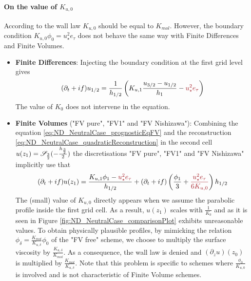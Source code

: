 \paragraph{On the value of $K_{u,0}$}
\label{sec:ND_StratifiedCase_viscosity0_FVpure}
According to the wall law $K_{u,0}$ should be equal to $K_{mol}$.
However, the boundary condition $K_{u,0} \phi_0 = u_\star^2 e_\tau$
does not behave the same way with Finite Differences and Finite
Volumes.
\begin{itemize}
	\item \textbf{Finite Differences}:
Injecting the boundary condition at the first grid level gives
		\begin{equation}
			(\partial_t+if) u_{1/2} = \frac{1}{h_{1/2}}
			\left(K_{u,1}\frac{u_{3/2} - u_{1/2}}{h_1}
			 - \emphase{u_\star^2 e_\tau} \right)
		\end{equation}
The value of $K_0$ does not intervene in the equation.
\item \textbf{Finite Volumes} ("FV pure", "FV1" and "FV Nishizawa"):
Combining the equation \eqref{eq:ND_NeutralCase_prognosticEqFV}
and the reconstruction
\eqref{eq:ND_NeutralCase_quadraticReconstruction} in the second cell
$u(z_1) = {\cal S}_{\frac{3}{2}}(-\frac{h_\frac{3}{2}}{2})$
the discretisations "FV pure", "FV1" and "FV Nishizawa"
implicitly use that
\begin{equation}
	(\partial_t+if) u(z_1) =
	\frac{K_{u,1} \phi_1 - \emphase{u_\star^2 e_\tau}}{h_{1/2}}
	+ (\partial_t+if)\left(\frac{\phi_1}{3}
	+ \emphase{\frac{u_\star^2 e_\tau}{6 K_{u,0}}}\right)h_{1/2}
\end{equation}
The (small) value of $K_{u,0}$ directly appears when we assume the
parabolic profile inside the first grid cell.
As a result, $u(z_1)$ scales with $\frac{1}{K_0}$ and
as it is seen in Figure \ref{fig:ND_NeutralCase_comparisonPlot}
exhibits unreasonable values.
To obtain physically plausible profiles,
by mimicking the relation
$\phi_{\delta} = \frac{K_{mol}}{K_{u,\delta}}\phi_0$ of the
"FV free" scheme, we choose to multiply the surface
viscosity by $\frac{K_{u,\delta}}{K_{mol}}$.
As a consequence, the wall law is denied and
$(\partial_z u)(z_0)$ is multiplied
by $\frac{K_{mol}}{K_{u,\delta}}$.
Note that this problem is specific to schemes where
$\frac{\phi_0}{K_{u,0}}$ is involved and
is not characteristic of Finite Volume schemes.
\end{itemize}

